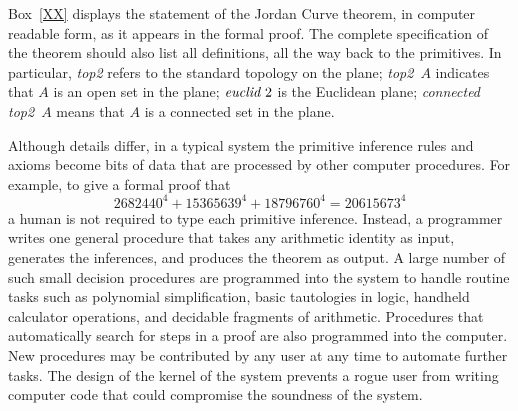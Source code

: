 \documentclass{llncs}
\begin{document}

Box~\ref{XX} displays the statement of the Jordan Curve theorem, in computer
readable form, as it appears in the formal
proof.  The complete specification of the theorem should also list
all definitions, all the way back to the primitives.  In particular, {\it top2} refers
to the standard topology on the plane; {\it top2}~$A$ indicates that $A$ is an open set
in the plane;  $\hbox{\it euclid}\,\,2$ is the Euclidean plane; {\it connected top2}~$A$ means that
$A$ is a connected set in the plane.

\bigskip
\noindent
{}
\medskip

Although details differ, 
in a typical system the primitive inference rules and axioms
become bits of data that are processed by other computer procedures.
For example, to give a formal proof that 
$$
2682440^4 + 15365639^4 + 18796760^4 = 20615673^4
$$
a human is not required to type each primitive inference.  Instead,
a programmer writes one general procedure that takes any arithmetic
identity as input,  generates the inferences,
and produces the theorem as output.   A large number of such
small decision procedures are programmed into the system to handle
routine tasks such as polynomial simplification, basic tautologies in logic,
handheld calculator operations, 
and decidable fragments of arithmetic.  
Procedures that automatically search for steps in a proof
are also programmed into the computer.  
New procedures may be contributed
by any user at any time to automate further tasks.
The design of the kernel of the system prevents a rogue
user from writing computer code that could compromise the soundness of the system.%
\end{document}
